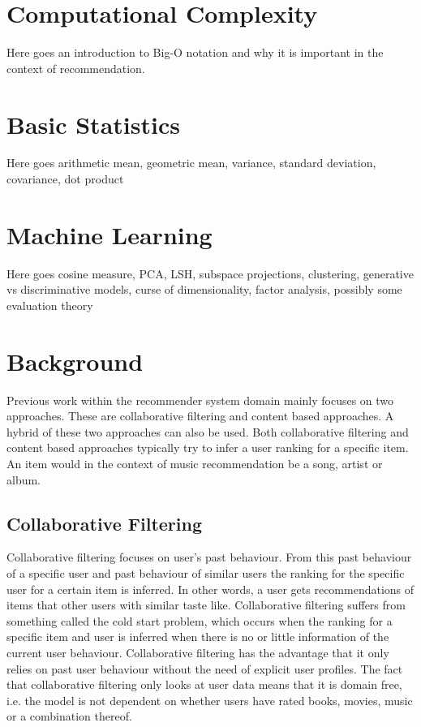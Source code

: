 \chapter{Computational Complexity}
Here goes an introduction to Big-O notation and why it is important in the context of recommendation.

\chapter{Basic Statistics}
Here goes arithmetic mean, geometric mean, variance, standard deviation, covariance, dot product

\chapter{Machine Learning}
Here goes cosine measure, PCA, LSH, subspace projections, clustering, generative vs discriminative models, curse of dimensionality, factor analysis, possibly some evaluation theory

\chapter{Background}

Previous work within the recommender system domain mainly focuses on two approaches. These are collaborative filtering and content based approaches. A hybrid of these two approaches can also be used. Both collaborative filtering and content based approaches typically try to infer a user ranking for a specific item\cite{melville2002content}. An item would in the context of music recommendation be a song, artist or album.

\section{Collaborative Filtering}
Collaborative filtering focuses on user's past behaviour. From this past behaviour of a specific user and past behaviour of similar users the ranking for the specific user for a certain item is inferred\cite{sarwar2001item}\cite{su2009survey}. In other words, a user gets recommendations of items that other users with similar taste like\cite{adomavicius2005toward}. Collaborative filtering suffers from something called the cold start problem, which occurs when the ranking for a specific item and user is inferred when there is no or little information of the current user behaviour\cite{herlocker2004evaluating}. Collaborative filtering has the advantage that it only relies on past user behaviour without the need of explicit user profiles. The fact that collaborative filtering only looks at user data means that it is domain free, i.e. the model is not dependent on whether users have rated books, movies, music or a combination thereof\cite{hu2008collaborative}.

